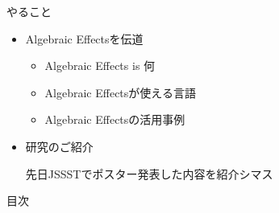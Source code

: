 \switchfooter
\begin{frame}{やること}
    \vfill
    \begin{itemize}
        \item[\faicon{wifi}] \alert{Algebraic Effects}を伝道

            \begin{itemize}
                \item[\coloremoji{🤔}] Algebraic Effects is 何
                \item[\blue{\faicon{language}}] Algebraic Effectsが使える言語
                \item[\coloremoji{🙆}] Algebraic Effectsの活用事例
            \end{itemize}
        \item[\coloremoji{🔬}] 研究のご紹介

            {\small 先日JSSSTでポスター発表した内容を紹介シマス}
    \end{itemize}

    \vfill
\end{frame}

\begin{frame}{目次}
    \begin{multicols}{2}
        \tableofcontents
    \end{multicols}

\end{frame}
\switchfooter

